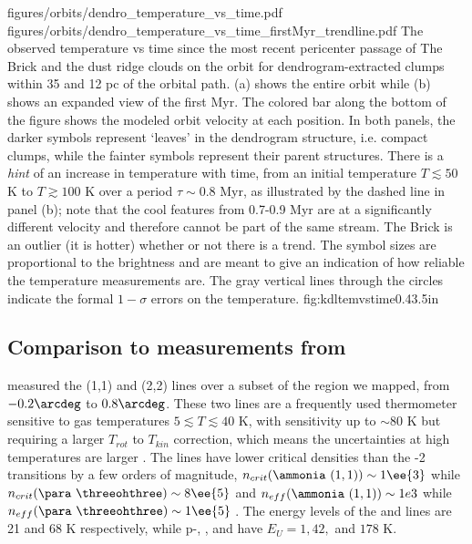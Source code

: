 \FigureTwo
{figures/orbits/dendro_temperature_vs_time.pdf}
{figures/orbits/dendro_temperature_vs_time_firstMyr_trendline.pdf}
{The observed temperature vs time since the most recent pericenter passage of
The Brick and the dust ridge clouds on the \citet{Kruijssen2015a} orbit for
dendrogram-extracted clumps within 35 \kms and 12 pc of the orbital path.  
(a) shows the entire orbit
while (b) shows an expanded
view of the first Myr.  The colored bar along the bottom of the figure shows the
modeled orbit velocity at each position.
In both panels,
the darker symbols represent `leaves'
in the dendrogram structure, i.e. compact clumps, while the fainter symbols
represent their parent structures. There is a \emph{hint} of an 
increase in temperature with time, from an initial temperature $T\lesssim50$ K
to $T\gtrsim100$ K over a period $\tau\sim0.8$ Myr, as illustrated by the
dashed line in panel (b); note that the cool features from 0.7-0.9 Myr are
at a significantly different velocity and therefore cannot be part of the same
stream.  The Brick is an outlier (it is hotter) whether or not there is a
trend.  The symbol sizes are proportional to the \para \threetwoone brightness
and are meant to give
an indication of how reliable the temperature measurements are.  The gray
vertical lines through the circles indicate the formal $1-\sigma$ errors on the
temperature.
}
{fig:kdltemvstime}{0.4}{3.5in}

\subsection{Comparison to \ammonia measurements from \citet{Ott2014a}}
\label{sec:ammoniacompare}
\citet{Ott2014a} measured the \ammonia (1,1) and (2,2) lines over a subset of the
region we mapped, from $-0.2\arcdeg$ to $0.8\arcdeg$.  These two lines are
a frequently
used thermometer sensitive to gas temperatures $5 \lesssim T \lesssim 40$ K,
with sensitivity up to $\sim80$ K but requiring a larger $T_{rot}$ to $T_{kin}$
correction, which means the uncertainties at high temperatures are larger
\citep[][Figure 1]{Mangum2013a}.  The \ammonia lines have lower critical
densities than the -2 transitions by a few orders of magnitude,
$n_{crit}(\textrm{\ammonia}~(1,1))\sim1\ee{3}$ \percc while $n_{crit}(\para~
\threeohthree)\sim8\ee{5}$ \percc and $n_{eff}(\textrm{\ammonia}~(1,1))\sim1e3$
while $n_{eff}(\para~\threeohthree)\sim1\ee{5}$ \citep[][]{Shirley2015a}.
The energy levels of the \threeohthree and \threetwoone lines are 21 and 68 K
respectively, while p-\ammonia \oneone, \twotwo, and \fourfour have $E_U = 1,
42, $ and $178$ K.

